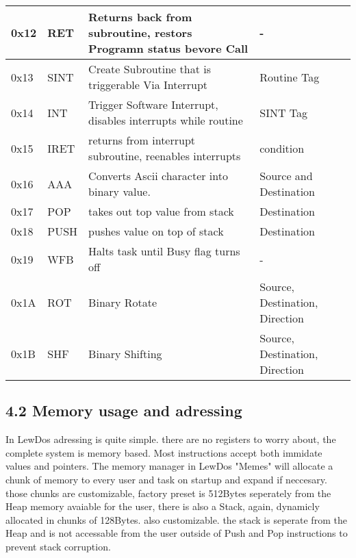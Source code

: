 \documentclass[12pt, letterpaper]{article}
\begin{document}
{\begin{tabularx}{\textwidth}{|p{1.3cm}|l|X|l|}
        \hline
        0x12 & RET & Returns back from subroutine, restors Programn status bevore Call & - \\
        \hline
        0x13 & SINT & Create Subroutine that is triggerable Via Interrupt & Routine Tag \\
        \hline
        0x14 & INT & Trigger Software Interrupt, disables interrupts while routine & SINT Tag \\
        \hline
        0x15 & IRET & returns from interrupt subroutine, reenables interrupts & condition \\
        \hline
        0x16 & AAA & Converts Ascii character into binary value. & Source and Destination \\
        \hline
        0x17 & POP & takes out top value from stack & Destination \\
        \hline
        0x18 & PUSH & pushes value on top of stack & Destination \\
        \hline
        0x19 & WFB & Halts task until Busy flag turns off & - \\
        \hline
        0x1A & ROT & Binary Rotate & Source, Destination, Direction \\
        \hline
        0x1B & SHF & Binary Shifting & Source, Destination, Direction \\
        \hline
    \end{tabularx}
}
\subsection*{4.2 Memory usage and adressing}
In LewDos adressing is quite simple. there are no registers to worry about, the complete system is memory based. Most instructions accept both immidate values and pointers.
The memory manager in LewDos "Memes" will allocate a chunk of memory to every user and task on startup and expand if neccesary. those chunks are customizable, factory preset is 512Bytes
seperately from the Heap memory avaiable for the user, there is also a Stack, again, dynamicly allocated in chunks of 128Bytes. also customizable. the stack is seperate from the Heap and
is not accessable from the user outside of Push and Pop instructions to prevent stack corruption.
\end{document}
